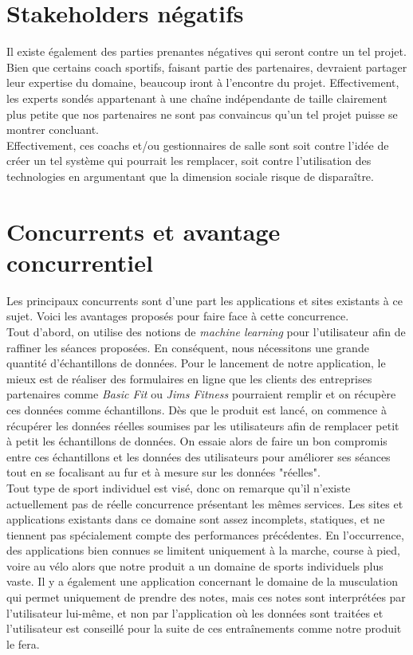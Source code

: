 \section{Stakeholders négatifs}

Il existe également des parties prenantes négatives qui seront contre un tel projet. Bien que certains coach sportifs, faisant partie des partenaires, devraient partager leur expertise du domaine, beaucoup iront à l'encontre du projet. Effectivement, les experts sondés appartenant à une chaîne indépendante de taille clairement plus petite que nos partenaires ne sont pas convaincus qu'un tel projet puisse se montrer concluant.\\

Effectivement, ces coachs et/ou gestionnaires de salle sont soit contre l'idée de créer un tel système qui pourrait les remplacer, soit contre l'utilisation des technologies en argumentant que la dimension sociale risque de disparaître. 

\section{Concurrents et avantage concurrentiel}

Les principaux concurrents sont d'une part les applications et sites existants à ce sujet. Voici les avantages proposés pour faire face à cette concurrence.\\

Tout d'abord, on utilise des notions de \textit{machine learning} pour l'utilisateur afin de raffiner les séances proposées. En conséquent,  nous nécessitons une grande quantité d'échantillons de données. Pour le lancement de notre application, le mieux est de réaliser des formulaires en ligne que les clients des entreprises partenaires comme \textit{Basic Fit} ou \textit{Jims Fitness} pourraient remplir et on récupère ces données comme échantillons. Dès que le produit est lancé, on commence à récupérer les données réelles soumises par les utilisateurs afin de remplacer petit à petit les échantillons de données. On essaie alors de faire un bon compromis entre ces échantillons et les données des utilisateurs pour améliorer ses séances tout en se focalisant au fur et à mesure sur les données "réelles".\\

Tout type de sport individuel est visé, donc on remarque qu'il n'existe actuellement pas de réelle concurrence présentant les mêmes services. Les sites et applications existants dans ce domaine sont assez incomplets, statiques, et ne tiennent pas spécialement compte des performances précédentes. En l'occurrence, des applications bien connues se limitent uniquement à la marche, course à pied, voire au vélo alors que notre produit a un domaine de sports individuels plus vaste. Il y a également une application concernant le domaine de la musculation qui permet uniquement de prendre des notes, mais ces notes sont interprétées par l'utilisateur lui-même, et non par l'application où les données sont traitées et l'utilisateur est conseillé pour la suite de ces entraînements comme notre produit le fera.\\

